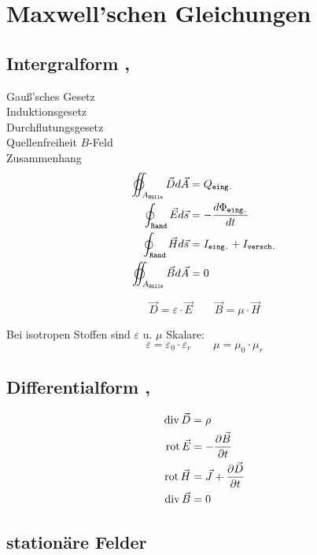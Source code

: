 \section{Maxwell’schen Gleichungen}

\subsection{Intergralform , }
Gauß'sches Gesetz\\
Induktionsgesetz\\
Durchflutungsgesetz\\
Quellenfreiheit $B$-Feld\\
Zusammenhang
\begin{align*}
    \varoiint_{A_\texttt{Hülle}} \vec{D} d \vec{A} & = Q_\texttt{eing.}                      \\
    \oint_\texttt{Rand} \vec{E} d \vec{s}          & = -\dfrac{d\Phi_\texttt{eing.}}{dt}     \\
    \oint_\texttt{Rand} \vec{H} d \vec{s}          & = I_\texttt{eing.} + I_\texttt{versch.} \\
    \varoiint_{A_\texttt{Hülle}} \vec{B} d \vec{A} & = 0
\end{align*}

\[
    \vec{D} = \varepsilon \cdot \vec{E} \qquad
    \vec{B} = \mu \cdot \vec{H}
\]

Bei isotropen Stoffen sind $\varepsilon$ u. $\mu$ Skalare:
\[
    \varepsilon = \varepsilon_0 \cdot \varepsilon_r \qquad \mu = \mu_0 \cdot \mu_r
\]

\subsection{Differentialform , }
\begin{align*}
    \operatorname{div} \vec{D} & = \rho                                           \\
    \operatorname{rot} \vec{E} & = -\dfrac{\partial \vec{B}}{\partial t}          \\
    \operatorname{rot} \vec{H} & = \vec{J} + \dfrac{\partial \vec{D}}{\partial t} \\
    \operatorname{div} \vec{B} & = 0
\end{align*}

\subsection{stationäre Felder}

